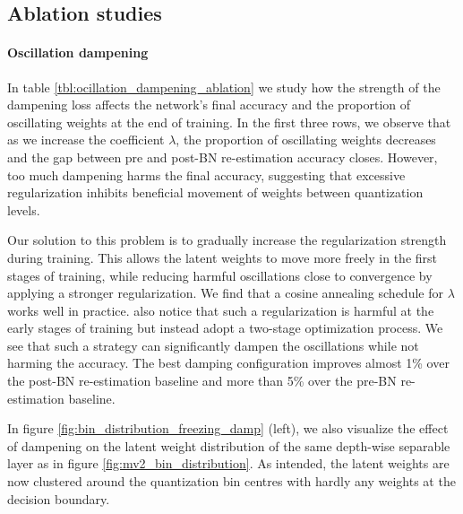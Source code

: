 
\subsection{Ablation studies}
\label{sec:ablation_studies}
\paragraph{Oscillation dampening}
In table \ref{tbl:ocillation_dampening_ablation} we study how the strength of the dampening loss affects the network's final accuracy and the proportion of oscillating weights at the end of training. In the first three rows, we observe that as we increase the coefficient $\lambda$, the proportion of oscillating weights decreases and the gap between pre and post-BN re-estimation accuracy closes. However, too much dampening harms the final accuracy, suggesting that excessive regularization inhibits beneficial movement of weights between quantization levels.

Our solution to this problem is to gradually increase the regularization strength during training. This allows the latent weights to move more freely in the first stages of training, while reducing harmful oscillations close to convergence by applying a stronger regularization. We find that a cosine annealing schedule for $\lambda$ works well in practice. \citet{binreg} also notice that such a regularization is harmful at the early stages of training but instead adopt a two-stage optimization process. We see that such a strategy can significantly dampen the oscillations while not harming the accuracy. The best damping configuration improves almost 1\% over the post-BN re-estimation baseline and more than 5\% over the pre-BN re-estimation baseline.

In figure \ref{fig:bin_distribution_freezing_damp} (left), we also visualize the effect of dampening on the latent weight distribution of the same depth-wise separable layer as in figure \ref{fig:mv2_bin_distribution}. As intended, the latent weights are now clustered around the quantization bin centres with hardly any weights at the decision boundary. 

